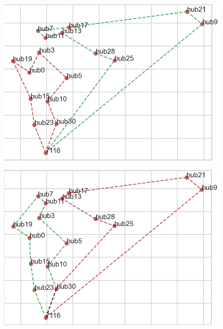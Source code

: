 
\begin{figure}
	\centering
	\begin{minipage}{.5\textwidth}
		\centering
		\includegraphics[width=1\linewidth]{figures/experiments/ringsize/size_8_9.png}
		\label{fig:ringsize_89}
	\end{minipage}%
	\begin{minipage}{.5\textwidth}
		\centering
		\includegraphics[width=1\linewidth]{figures/experiments/ringsize/size_10.png}
		\label{fig:ringsize_10}
	\end{minipage}
\end{figure}